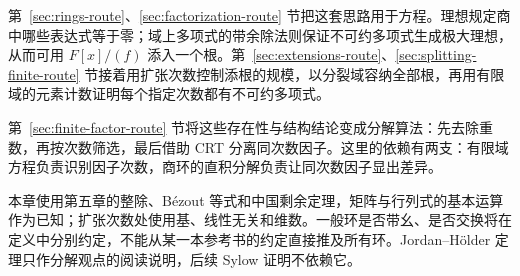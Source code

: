 \documentclass[lang=cn,a4paper,fontset=none,zihao=false,10pt,openany,twoside]{beautybook}
\numberwithin{algorithm}{chapter}
\begin{document}
第~\ref{sec:rings-route}、\ref{sec:factorization-route} 节把这套思路用于方程。理想规定商中哪些表达式等于零；域上多项式的带余除法则保证不可约多项式生成极大理想，从而可用 $F[x]/(f)$ 添入一个根。第~\ref{sec:extensions-route}、\ref{sec:splitting-finite-route} 节接着用扩张次数控制添根的规模，以分裂域容纳全部根，再用有限域的元素计数证明每个指定次数都有不可约多项式。

第~\ref{sec:finite-factor-route} 节将这些存在性与结构结论变成分解算法：先去除重数，再按次数筛选，最后借助 CRT 分离同次数因子。这里的依赖有两支：有限域方程负责识别因子次数，商环的直积分解负责让同次数因子显出差异。
\begin{center}
\end{center}
本章使用第五章的整除、Bézout 等式和中国剩余定理，矩阵与行列式的基本运算作为已知；扩张次数处使用基、线性无关和维数。一般环是否带幺、是否交换将在定义中分别约定，不能从某一本参考书的约定直接推及所有环。Jordan--Hölder 定理只作分解观点的阅读说明，后续 Sylow 证明不依赖它。
\end{document}
